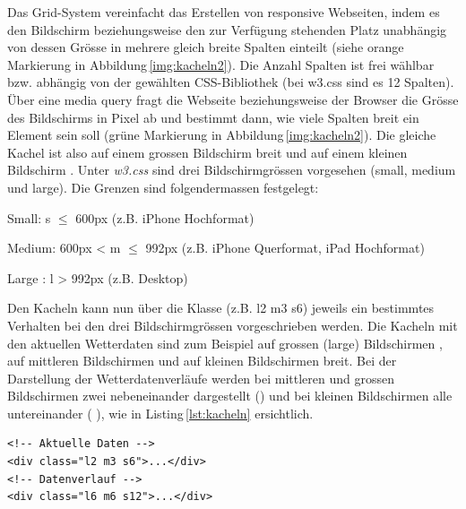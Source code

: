 \noindent
Das Grid-System vereinfacht das Erstellen von responsive Webseiten, indem es den Bildschirm beziehungsweise den zur Verfügung stehenden Platz unabhängig von dessen Grösse in mehrere gleich breite Spalten einteilt (siehe orange Markierung in Abbildung\,\ref{img:kacheln2}). Die Anzahl Spalten ist frei wählbar bzw. abhängig von der gewählten CSS-Bibliothek (bei w3.css sind es 12 Spalten). Über eine media query fragt die Webseite beziehungsweise der Browser die Grösse des Bildschirms in Pixel ab und bestimmt dann, wie viele Spalten breit ein Element sein soll (grüne Markierung in Abbildung\,\ref{img:kacheln2}). Die gleiche Kachel ist also auf einem grossen Bildschirm   breit und auf einem kleinen Bildschirm . Unter \emph{w3.css} sind drei Bildschirmgrössen vorgesehen (small, medium und large). Die Grenzen sind folgendermassen festgelegt:

\begin{description*}
  \item [Small:] s $\leq$ 600px (z.B. iPhone Hochformat)
  \item [Medium:] 600px < m $\leq$ 992px (z.B. iPhone Querformat, iPad Hochformat)
  \item [Large]: l > 992px (z.B. Desktop)
\end{description*}

\noindent
Den Kacheln kann nun über die Klasse (z.B. l2 m3 s6) jeweils ein bestimmtes Verhalten bei den drei Bildschirmgrössen vorgeschrieben werden. Die Kacheln mit den aktuellen Wetterdaten sind zum Beispiel auf grossen (large) Bildschirmen , auf mittleren Bildschirmen  und auf kleinen Bildschirmen  breit. Bei der Darstellung der Wetterdatenverläufe werden bei mittleren und grossen Bildschirmen zwei nebeneinander dargestellt () und bei kleinen Bildschirmen alle untereinander ( ), wie in Listing\,\ref{lst:kacheln} ersichtlich.

\vspace{3mm}
\begin{lstlisting}[label=lst:kacheln,caption=Konfiguration der Anzahl Kacheln abhähngig von der Bildschirmgrösse, language=HTML5, style=htmlcssjs]
<!-- Aktuelle Daten -->
<div class="l2 m3 s6">...</div>
<!-- Datenverlauf -->
<div class="l6 m6 s12">...</div>
\end{lstlisting}
\vspace{3mm}

